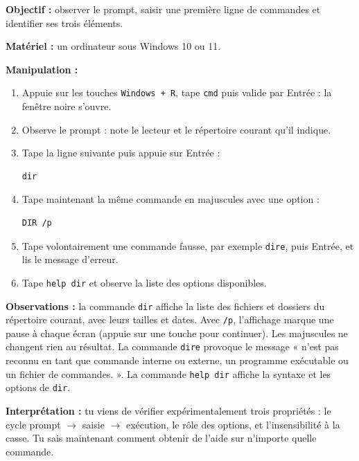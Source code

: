 \documentclass[11pt]{article}
\begin{document}
\begin{experience}
\textbf{Objectif :} observer le prompt, saisir une première ligne de commandes et identifier ses trois éléments.

\textbf{Matériel :} un ordinateur sous Windows 10 ou 11.

\textbf{Manipulation :}
\begin{enumerate}
\item Appuie sur les touches \texttt{Windows + R}, tape \texttt{cmd} puis valide par Entrée : la fenêtre noire s'ouvre.
\item Observe le prompt : note le lecteur et le répertoire courant qu'il indique.
\item Tape la ligne suivante puis appuie sur Entrée :
\begin{lstlisting}
dir
\end{lstlisting}
\item Tape maintenant la même commande en majuscules avec une option :
\begin{lstlisting}
DIR /p
\end{lstlisting}
\item Tape volontairement une commande fausse, par exemple \texttt{dire}, puis Entrée, et lis le message d'erreur.
\item Tape \texttt{help dir} et observe la liste des options disponibles.
\end{enumerate}

\textbf{Observations :} la commande \texttt{dir} affiche la liste des fichiers et dossiers du répertoire courant, avec leurs tailles et dates. Avec \texttt{/p}, l'affichage marque une pause à chaque écran (appuie sur une touche pour continuer). Les majuscules ne changent rien au résultat. La commande \texttt{dire} provoque le message « n'est pas reconnu en tant que commande interne ou externe, un programme exécutable ou un fichier de commandes. ». La commande \texttt{help dir} affiche la syntaxe et les options de \texttt{dir}.

\textbf{Interprétation :} tu viens de vérifier expérimentalement trois propriétés : le cycle prompt $\rightarrow$ saisie $\rightarrow$ exécution, le rôle des options, et l'insensibilité à la casse. Tu sais maintenant comment obtenir de l'aide sur n'importe quelle commande.
\end{experience}
\end{document}
